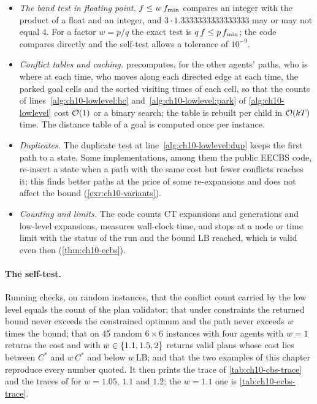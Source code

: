 \begin{itemize}
  \item \emph{The band test in floating point.} $f \le w\,f_{\min}$
        compares an integer with the product of a float and an integer, and
        $3 \cdot 1.3333333333333333$ may or may not equal $4$. For a factor
        $w = p/q$ the exact test is $q\,f \le p\,f_{\min}$; the code
        compares directly and the self-test allows a tolerance of $10^{-9}$.
  \item \emph{Conflict tables and caching.}  precomputes, for
        the other agents' paths, who is where at each time, who moves along
        each directed edge at each time, the parked goal cells and the sorted
        visiting times of each cell, so that the counts of
        lines~\ref{alg:ch10-lowlevel:hc} and~\ref{alg:ch10-lowlevel:park} of
        \cref{alg:ch10-lowlevel} cost $\mathcal{O}\!\left(1\right)$ or a binary search; the table
        is rebuilt per child in $\mathcal{O}\!\left(kT\right)$ time. The distance table of a goal
        is computed once per instance.
  \item \emph{Duplicates.} The duplicate test at line~\ref{alg:ch10-lowlevel:dup} keeps the first path to a state. Some implementations, among them the public EECBS
        code, re-insert a state when a path with the same cost but fewer
        conflicts reaches it; this finds better paths at the price of some
        re-expansions and does not affect the bound (\cref{exr:ch10-variants}).
  \item \emph{Counting and limits.} The code counts CT expansions and
        generations and low-level expansions, measures wall-clock time, and
        stops at a node or time limit with the status of the run and the bound
        $\mathrm{LB}$ reached, which is valid even then (\cref{thm:ch10-ecbs}).
\end{itemize}

\paragraph{The self-test.}
Running  checks, on random instances, that
the conflict count carried by the low level equals the count of the plan
validator; that under constraints the returned bound never exceeds the
constrained optimum and the path never exceeds $w$ times the bound; that on
45 random $6 \times 6$ instances with four agents \ecbs with $w = 1$ returns
the \cbs cost and \ecbs with $w \in \left\{ 1.1, 1.5, 2 \right\}$ returns valid plans
whose cost lies between $C^*$ and $w\,C^*$ and below $w\,\mathrm{LB}$; and
that the two examples of this chapter reproduce every number quoted. It then
prints the trace of \cref{tab:ch10-cbs-trace} and the traces of \ecbs for
$w = 1.05$, $1.1$ and $1.2$; the $w = 1.1$ one is
\cref{tab:ch10-ecbs-trace}.

